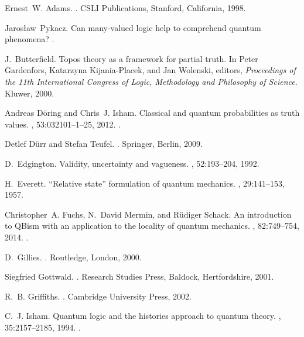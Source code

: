 \documentclass[12pt,a4paper,reqno]{article}
\renewcommand{\(}{\left(}
\renewcommand{\)}{\right)}
\newcommand{\<}{\langle}
\renewcommand{\>}{\rangle}
\theoremstyle{plain} %
\begin{document}
\begin{thebibliography}{10}

Ernest~W. Adams.
.
\newblock CSLI Publications, Stanford, California, 1998.

Jaros\l aw~Pykacz.
\newblock Can many-valued logic help to comprehend quantum phenomena?
.

J.~Butterfield.
\newblock Topos theory as a framework for partial truth.
\newblock In Peter Gardenfors, Katarzyna Kijania-Placek, and Jan Wolenski,
  editors, {\em Proceedings of the 11th International Congress of Logic,
  Methodology and Philosophy of Science}. Kluwer, 2000.

Andreas D{\"o}ring and Chris~J. Isham.
\newblock Classical and quantum probabilities as truth values.
, 53:032101--1--25, 2012.
.

Detlef D{\"u}rr and Stefan Teufel.
.
\newblock Springer, Berlin, 2009.

D.~Edgington.
\newblock Validity, uncertainty and vagueness.
, 52:193--204, 1992.

H.~Everett.
\newblock ``{R}elative state'' formulation of quantum mechanics.
, 29:141--153, 1957.

Christopher~A. Fuchs, N.~David Mermin, and R{\"u}diger Schack.
\newblock An introduction to {QB}ism with an application to the locality of
  quantum mechanics.
, 82:749--754, 2014.
.

D.~Gillies.
.
\newblock Routledge, London, 2000.

Siegfried Gottwald.
.
\newblock Research Studies Press, Baldock, Hertfordshire, 2001.

R.~B. Griffiths.
.
\newblock Cambridge University Press, 2002.

C.~J. Isham.
\newblock Quantum logic and the histories approach to quantum theory.
, 35:2157--2185, 1994.
.


\end{thebibliography}
\end{document}
